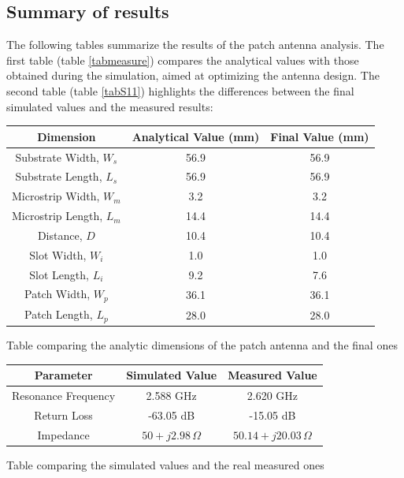 \documentclass[]{article}
\begin{document}
\subsection{Summary of results}
The following tables summarize the results of the patch antenna analysis. The first table (table \eqref{tabmeasure}) compares the analytical values with those obtained during the simulation, aimed at optimizing the antenna design. The second table (table \eqref{tabS11}) highlights the differences between the final simulated values and the measured results:
\begin{center}
	 \captionsetup{type=table} %
	\begin{tabular}{|c|c|c|}
		\hline
		\textbf{Dimension} & \textbf{Analytical Value (mm)} & \textbf{Final Value (mm)} \\
		\hline
		Substrate Width, $W_s$ & 56.9 & 56.9\\
		\hline
		Substrate Length, $L_s$ & 56.9 & 56.9\\
		\hline
		Microstrip Width, $W_m$ & 3.2 & 3.2\\
		\hline
		Microstrip Length, $L_m$ & 14.4& 14.4\\
		\hline
		Distance, $D$ & 10.4 & 10.4\\
		\hline
		Slot Width, $W_i$ & 1.0 & 1.0\\
		\hline
		Slot Length, $L_i$ & 9.2 & 7.6\\
		\hline
		Patch Width, $W_p$ & 36.1 & 36.1\\
		\hline
		Patch Length, $L_p$ & 28.0 & 28.0\\
		\hline
	\end{tabular}
	\caption{Table comparing the analytic dimensions of the patch antenna and the final ones}
	\label{tabmeasure}
\end{center}
\begin{center}
	\captionsetup{type=table} %
	\begin{tabular}{|c|c|c|}
		\hline
		\textbf{Parameter} & \textbf{Simulated Value} & \textbf{Measured Value} \\
		\hline
		Resonance Frequency & 2.588 GHz & 2.620 GHz\\
		\hline
		Return Loss & -63.05 dB & -15.05 dB\\
		\hline
		Impedance & $50 + j2.98 \, \Omega$ & $50.14 + j20.03 \, \Omega$\\
			\hline
	\end{tabular}
	\caption{Table comparing the simulated values and the real measured ones}
	\label{tabS11}
\end{center}
\end{document}
